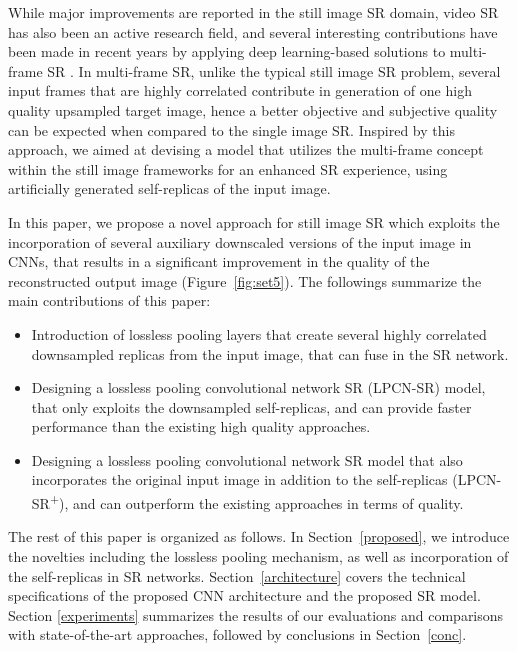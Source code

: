 \documentclass[10pt,twocolumn,letterpaper]{article}
\begin{document}
While major improvements are reported in the still image SR domain, video SR has also 
been an active research field, and several interesting contributions have been made
in recent years by applying deep learning-based solutions to multi-frame SR \cite{caballero2017,kappeler2016,tao2017,makansi2017}.
In multi-frame SR, unlike the typical still image SR problem, several input frames that are
highly correlated contribute in generation of one high quality upsampled target image, hence
a better objective and subjective quality can be expected when compared to the single image SR.
Inspired by this approach, we aimed at devising a model that utilizes the multi-frame concept
within the still image frameworks for an enhanced SR experience, using artificially generated
self-replicas of the input image.

In this paper, we propose a novel approach for still image SR which exploits the incorporation of 
several auxiliary downscaled versions of the input image in CNNs, that results in a significant 
improvement in the quality of the reconstructed output image (Figure~\ref{fig:set5}). The followings summarize the main contributions 
of this paper:
\begin{itemize}
    \item Introduction of lossless pooling layers that create several highly correlated downsampled replicas
from the input image, that can fuse in the SR network. 
    \item Designing a lossless pooling convolutional network SR (LPCN-SR) model, that only exploits the
downsampled self-replicas, and can provide faster performance than the existing high quality approaches.
    \item Designing a lossless pooling convolutional network SR model that also incorporates the original input
image in addition to the self-replicas (LPCN-SR\textsuperscript{+}), and can outperform the existing approaches 
in terms of quality.
\end{itemize}

The rest of this paper is organized as follows. In Section~\ref{proposed}, we introduce the novelties
including the lossless pooling mechanism, as well as incorporation of the self-replicas in SR networks. 
Section~\ref{architecture} covers the technical specifications of the proposed CNN architecture and the 
proposed SR model. Section \ref{experiments} summarizes the results of our evaluations and comparisons 
with state-of-the-art approaches, followed by conclusions in Section~\ref{conc}.
\end{document}
